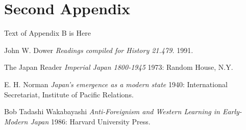 \documentclass{article}
\begin{document}
	\section{Second Appendix}
	Text of Appendix B is Here

	\newpage
	\begin{thebibliography}{1}
	 John W. Dower {\em Readings compiled for History 21.479.}  1991.

    The Japan Reader {\em Imperial Japan 1800-1945} 1973: Random House, N.Y.

   E. H. Norman {\em Japan's emergence as a modern state} 1940: International Secretariat, Institute of Pacific Relations.

   Bob Tadashi Wakabayashi {\em Anti-Foreignism and Western Learning in Early-Modern Japan} 1986: Harvard University Press.

  \end{thebibliography}
  
	\newpage
	\printindex
	
\end{document}
